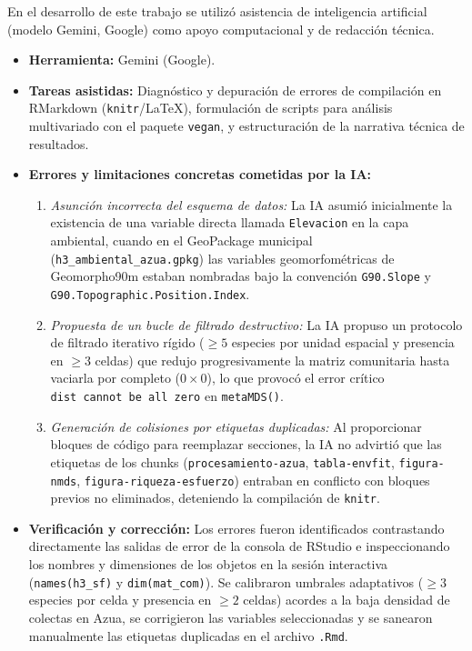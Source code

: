 \documentclass[
  12pt,
  man,
  floatsintext]{apa7}
\providecommand{\tightlist}{%
  \setlength{\itemsep}{0pt}\setlength{\parskip}{0pt}}
\begin{document}
En el desarrollo de este trabajo se utilizó asistencia de inteligencia artificial (modelo Gemini, Google) como apoyo computacional y de redacción técnica.

\begin{itemize}
\tightlist
\item
  \textbf{Herramienta:} Gemini (Google).
\item
  \textbf{Tareas asistidas:} Diagnóstico y depuración de errores de compilación en RMarkdown (\texttt{knitr}/LaTeX), formulación de scripts para análisis multivariado con el paquete \texttt{vegan}, y estructuración de la narrativa técnica de resultados.
\item
  \textbf{Errores y limitaciones concretas cometidas por la IA:}

  \begin{enumerate}
  \def\labelenumi{\arabic{enumi}.}
  \tightlist
  \item
    \emph{Asunción incorrecta del esquema de datos:} La IA asumió inicialmente la existencia de una variable directa llamada \texttt{Elevacion} en la capa ambiental, cuando en el GeoPackage municipal (\texttt{h3\_ambiental\_azua.gpkg}) las variables geomorfométricas de Geomorpho90m estaban nombradas bajo la convención \texttt{G90.Slope} y \texttt{G90.Topographic.Position.Index}.
  \item
    \emph{Propuesta de un bucle de filtrado destructivo:} La IA propuso un protocolo de filtrado iterativo rígido (\(\ge 5\) especies por unidad espacial y presencia en \(\ge 3\) celdas) que redujo progresivamente la matriz comunitaria hasta vaciarla por completo (\(0 \times 0\)), lo que provocó el error crítico \texttt{\textquotesingle{}dist\textquotesingle{}\ cannot\ be\ all\ zero} en \texttt{metaMDS()}.
  \item
    \emph{Generación de colisiones por etiquetas duplicadas:} Al proporcionar bloques de código para reemplazar secciones, la IA no advirtió que las etiquetas de los chunks (\texttt{procesamiento-azua}, \texttt{tabla-envfit}, \texttt{figura-nmds}, \texttt{figura-riqueza-esfuerzo}) entraban en conflicto con bloques previos no eliminados, deteniendo la compilación de \texttt{knitr}.
  \end{enumerate}
\item
  \textbf{Verificación y corrección:} Los errores fueron identificados contrastando directamente las salidas de error de la consola de RStudio e inspeccionando los nombres y dimensiones de los objetos en la sesión interactiva (\texttt{names(h3\_sf)} y \texttt{dim(mat\_com)}). Se calibraron umbrales adaptativos (\(\ge 3\) especies por celda y presencia en \(\ge 2\) celdas) acordes a la baja densidad de colectas en Azua, se corrigieron las variables seleccionadas y se sanearon manualmente las etiquetas duplicadas en el archivo \texttt{.Rmd}.
\end{itemize}
\end{document}
